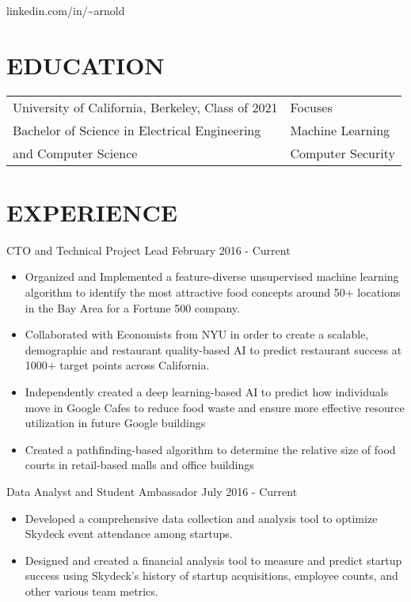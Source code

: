 \documentclass[10pt]{article}
\begin{document}
				 {linkedin.com/in/{\textasciitilde}arnold}      

\section*{EDUCATION}
		
		\begin{tabu}{X[l]X[c]}
			   University of California, Berkeley, Class of 2021 & Focuses \\
 			   Bachelor of Science in Electrical Engineering & Machine Learning \\ 
 			   and Computer Science & Computer Security  \\
		\end{tabu}

\justify
\section*{EXPERIENCE}

								{CTO and Technical Project Lead}
								{February 2016 - Current}                  		
	                   \begin{itemize} 
	                    		\item Organized and Implemented a feature-diverse unsupervised machine learning algorithm to identify the most attractive food concepts around 50+ locations in the Bay Area for a Fortune 500 company.
	                    		\item Collaborated with Economists from NYU in order to create a scalable, demographic and restaurant quality-based AI to predict restaurant success at 1000+ target points across California.
	                    		\item Independently created a deep learning-based AI to predict how individuals move in Google Cafes to reduce food waste and ensure more effective resource utilization in future Google buildings
	                    		\item Created a pathfinding-based algorithm to determine the relative size of food courts in retail-based malls and office buildings
	                    \end{itemize}
	                    		
	   		
	   			{Data Analyst and Student Ambassador}
	   			{July 2016 - Current}
			  		\begin{itemize}
	                   		\item Developed a comprehensive data collection and analysis tool to optimize Skydeck event attendance among startups.
	                   		\item Designed and created a financial analysis tool to measure and predict startup success using Skydeck's history of startup acquisitions, employee counts, and other various team metrics.
	                  \end{itemize}
                  	 
\end{document}
